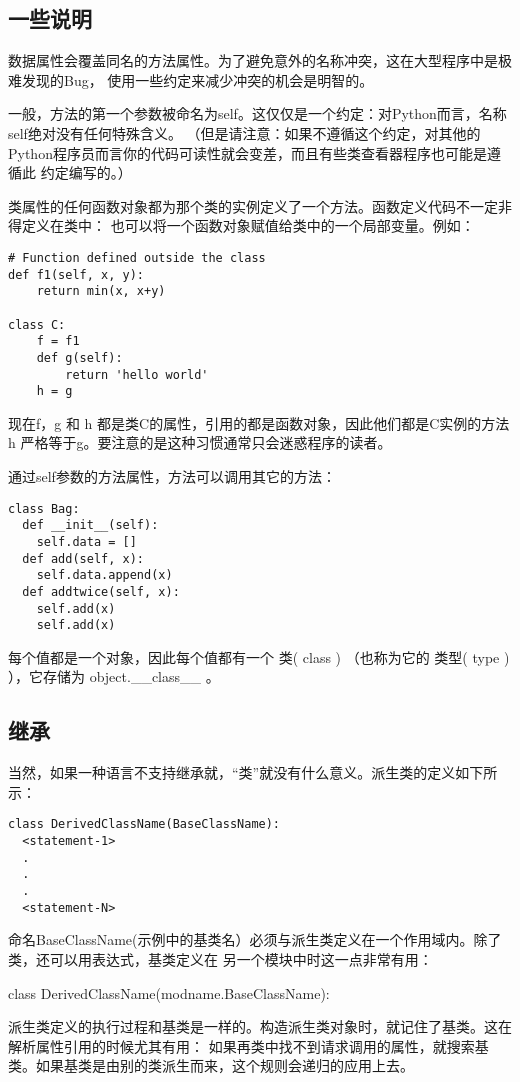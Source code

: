 \documentclass[UTF8]{ctexart}
\begin{document}
\subsection{一些说明}
数据属性会覆盖同名的方法属性。为了避免意外的名称冲突，这在大型程序中是极难发现的Bug，
使用一些约定来减少冲突的机会是明智的。

一般，方法的第一个参数被命名为self。这仅仅是一个约定：对Python而言，名称self绝对没有任何特殊含义。
（但是请注意：如果不遵循这个约定，对其他的Python程序员而言你的代码可读性就会变差，而且有些类查看器程序也可能是遵循此
约定编写的。）

类属性的任何函数对象都为那个类的实例定义了一个方法。函数定义代码不一定非得定义在类中：
也可以将一个函数对象赋值给类中的一个局部变量。例如：
\begin{verbatim}
# Function defined outside the class
def f1(self, x, y):
    return min(x, x+y)

class C:
    f = f1
    def g(self):
        return 'hello world'
    h = g
\end{verbatim}

现在f，g 和 h 都是类C的属性，引用的都是函数对象，因此他们都是C实例的方法\- \-
h 严格等于g。要注意的是这种习惯通常只会迷惑程序的读者。

通过self参数的方法属性，方法可以调用其它的方法：
\begin{verbatim}
class Bag:
  def __init__(self):
    self.data = []
  def add(self, x):
    self.data.append(x)
  def addtwice(self, x):
    self.add(x)
    self.add(x)
\end{verbatim}

每个值都是一个对象，因此每个值都有一个 类( class ) （也称为它的 类型( type ) ），它存储为 object.\_\_class\_\_ 。

\subsection{继承}
当然，如果一种语言不支持继承就，``类''就没有什么意义。派生类的定义如下所示：
\begin{verbatim}
class DerivedClassName(BaseClassName):
  <statement-1>
  .
  .
  .
  <statement-N>
\end{verbatim}
命名BaseClassName(示例中的基类名）必须与派生类定义在一个作用域内。除了类，还可以用表达式，基类定义在
另一个模块中时这一点非常有用：

class DerivedClassName(modname.BaseClassName):

派生类定义的执行过程和基类是一样的。构造派生类对象时，就记住了基类。这在解析属性引用的时候尤其有用：
如果再类中找不到请求调用的属性，就搜索基类。如果基类是由别的类派生而来，这个规则会递归的应用上去。
\end{document}
